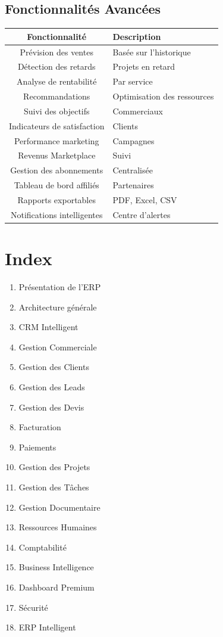 \documentclass[12pt,a4paper,oneside]{book}
\begin{document}
\section{Fonctionnalités Avancées}
\begin{center}
\begin{tabular}{|c|p{10cm}|}
\hline
\rowcolor{electrongold}
\color{white}\textbf{Fonctionnalité} & \color{white}\textbf{Description} \\
\hline
Prévision des ventes & Basée sur l'historique \\
\hline
Détection des retards & Projets en retard \\
\hline
Analyse de rentabilité & Par service \\
\hline
Recommandations & Optimisation des ressources \\
\hline
Suivi des objectifs & Commerciaux \\
\hline
Indicateurs de satisfaction & Clients \\
\hline
Performance marketing & Campagnes \\
\hline
Revenus Marketplace & Suivi \\
\hline
Gestion des abonnements & Centralisée \\
\hline
Tableau de bord affiliés & Partenaires \\
\hline
Rapports exportables & PDF, Excel, CSV \\
\hline
Notifications intelligentes & Centre d'alertes \\
\hline
\end{tabular}
\end{center}

\appendix

\chapter{Index}
\begin{enumerate}
\item Présentation de l'ERP
\item Architecture générale
\item CRM Intelligent
\item Gestion Commerciale
\item Gestion des Clients
\item Gestion des Leads
\item Gestion des Devis
\item Facturation
\item Paiements
\item Gestion des Projets
\item Gestion des Tâches
\item Gestion Documentaire
\item Ressources Humaines
\item Comptabilité
\item Business Intelligence
\item Dashboard Premium
\item Sécurité
\item ERP Intelligent
\end{enumerate}
\end{document}
